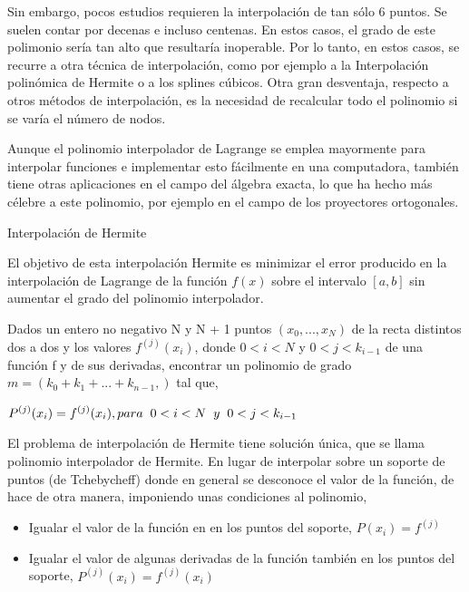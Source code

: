 \hspace{0.4cm} Sin embargo, pocos estudios requieren la interpolaci\'on de tan s\'olo 6 puntos. Se suelen contar por decenas e incluso centenas. En estos casos, el grado de este polimonio ser\'ia tan alto que resultar\'ia inoperable. Por lo tanto, en estos casos, se recurre a otra t\'ecnica de interpolaci\'on, como por ejemplo a la Interpolaci\'on polin\'omica de Hermite o a los splines c\'ubicos. Otra gran desventaja, respecto a otros m\'etodos de interpolaci\'on, es la necesidad de recalcular todo el polinomio si se var\'ia el n\'umero de nodos.

\hspace{0.4cm} Aunque el polinomio interpolador de Lagrange se emplea mayormente para interpolar funciones e implementar esto f\'acilmente en una computadora, tambi\'en tiene otras aplicaciones en el campo del \'algebra exacta, lo que ha hecho m\'as c\'elebre a este polinomio, por ejemplo en el campo de los proyectores ortogonales.


Interpolaci\'on de Hermite

\hspace{0.4cm} El objetivo de esta interpolaci\'on Hermite es minimizar el error producido en la interpolaci\'on de Lagrange de la funci\'on $f(x)$ sobre el intervalo $[a, b]$ sin aumentar el grado del polinomio interpolador.


\hspace{0.4cm} Dados un entero no negativo N y  N + 1 puntos $(x_{0},..., x_{N})$ de la recta distintos dos a dos y los valores $f^{(j)} (x_{i})$, donde $0<i<N$ y $0<j<k_{i-1}$ de una funci\'on f y de sus derivadas, encontrar un polinomio de grado $m = (k_{0} +k_{1} +...+k_{n-1},)$ tal que,

\begin{center}
$\displaystyle{P^{(j)} (x_{i}) = f^{(j)} (x_{i}), para \hspace{0.2cm} 0<i<N \hspace{0.2cm}y \hspace{0.2cm} 0<j<k_{i-1}}$
\end{center}

\hspace{0.4cm} El problema de interpolaci\'on de Hermite tiene soluci\'on \'unica, que se llama polinomio interpolador de Hermite. En lugar de interpolar sobre un soporte de puntos (de Tchebycheff) donde en general se desconoce el valor de la funci\'on, de hace de otra manera, imponiendo unas condiciones al polinomio,

\begin{itemize}
  \item  Igualar el valor de la funci\'on en en los puntos del soporte, $P (x_{i}) = f^{(j)}$
  \item Igualar el valor de algunas derivadas de la funci\'on tambi\'en en los puntos del soporte, $P^{(j)} (x_{i}) = f^{(j)} (x_{i})$
\end{itemize}

